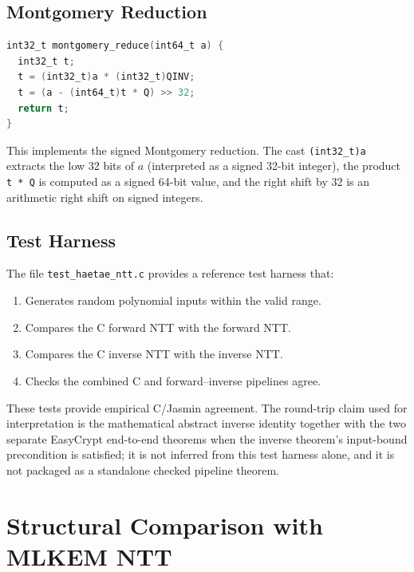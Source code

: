 \subsection{Montgomery Reduction}

\begin{lstlisting}[language=C,
  caption={Montgomery reduction from \texttt{reduce.c}},
  label={lst:c_mont}]
int32_t montgomery_reduce(int64_t a) {
  int32_t t;
  t = (int32_t)a * (int32_t)QINV;
  t = (a - (int64_t)t * Q) >> 32;
  return t;
}
\end{lstlisting}

This implements the signed Montgomery reduction.  The cast \texttt{(int32\_t)a}
extracts the low 32 bits of $a$ (interpreted as a signed 32-bit integer), the
product \texttt{t * Q} is computed as a signed 64-bit value, and the right
shift by 32 is an arithmetic right shift on signed integers.

\subsection{Test Harness}

The file \texttt{test\_haetae\_ntt.c} provides a reference test harness that:
\begin{enumerate}
  \item Generates random polynomial inputs within the valid range.
  \item Compares the C forward NTT with the \jasmin{} forward NTT.
  \item Compares the C inverse NTT with the \jasmin{} inverse NTT.
  \item Checks the combined C and \jasmin{} forward--inverse pipelines agree.
\end{enumerate}

These tests provide empirical C/Jasmin agreement.  The round-trip claim used
for interpretation is the mathematical abstract inverse identity together
with the two separate EasyCrypt end-to-end theorems when the inverse theorem's
input-bound precondition is satisfied; it is not inferred from this test
harness alone, and it is not packaged as a standalone checked pipeline theorem.

\section{Structural Comparison with MLKEM NTT}
\label{sec:haetae_vs_mlkem}

